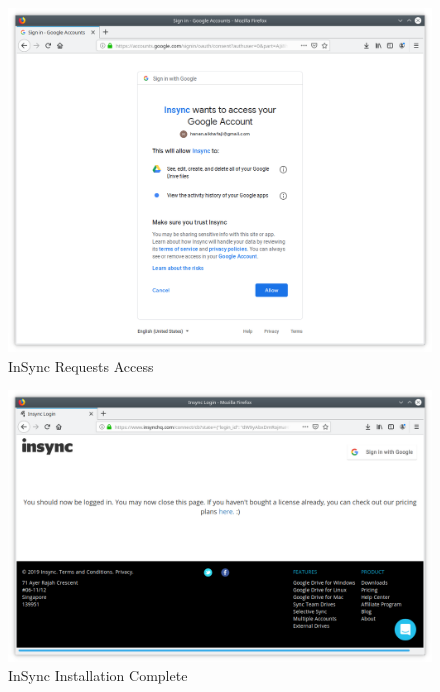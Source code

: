 \begin{figure}[htb]
  \centering
  \includegraphics[scale=0.4]{images/insync2.png}
  \caption{InSync Requests Access}
  \label{fig:insync2}
\end{figure}
\begin{figure}[htb]
  \centering
  \includegraphics[scale=0.4]{images/insync3.png}
  \caption{InSync Installation Complete}
  \label{fig:insync3}
\end{figure}
